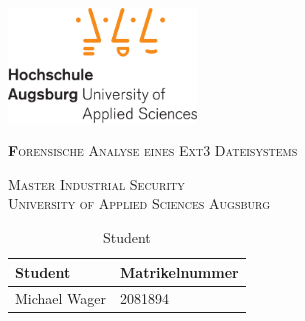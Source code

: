 \documentclass[
11pt,
liststotoc,
bibtotocnumbered,
headheight=34pt     %
]{scrartcl}             %
\begin{document}
	\begin{titlepage}
		\centering
		\includegraphics[width=5cm]{figures/hsa_logo-eps-converted-to.pdf}
		
		\vspace{1cm}
		{\scshape\LARGE\textbf Forensische Analyse eines Ext3 Dateisystems\par}
		\vspace{0.3cm}
		{\scshape\Large
			Master Industrial Security \\
			University of Applied Sciences Augsburg
			
			\par}
		\vspace{1cm}
		
		
		\vspace{8cm}
		
		\begin{table}[!htbp]
			\centering
			\caption{Student}
			\begin{tabular}{ll}
				\textbf{Student}			&	\textbf{Matrikelnummer}		\\
				\hline
				\hline
				Michael Wager	&	2081894			\\
			\end{tabular}
		\end{table}
		
		\date{\today}
	\end{titlepage}
	
	
	
	
	
\end{document}
